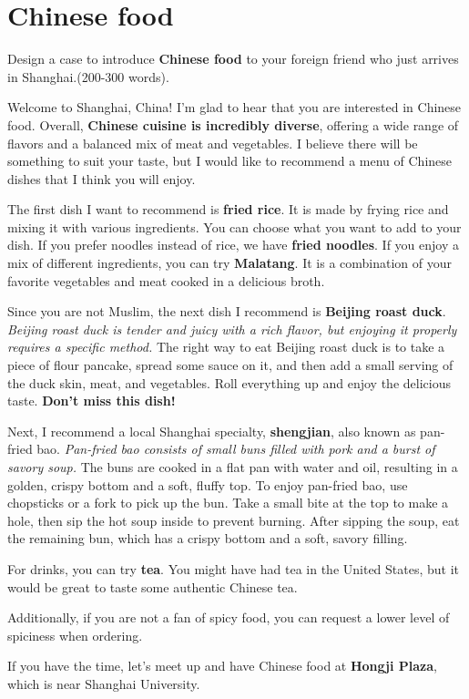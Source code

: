 \section{Chinese food}

\begin{question}{}{}
    Design a case to introduce \textbf{Chinese food} to your foreign friend who just arrives in Shanghai.(200-300 words).
\end{question}

Welcome to Shanghai, China! I'm glad to hear that you are interested in Chinese food. Overall, \textbf{Chinese cuisine is incredibly diverse}, offering a wide range of flavors and a balanced mix of meat and vegetables. I believe there will be something to suit your taste, but I would like to recommend a menu of Chinese dishes that I think you will enjoy.

The first dish I want to recommend is \textbf{fried rice}. It is made by frying rice and mixing it with various ingredients. You can choose what you want to add to your dish. If you prefer noodles instead of rice, we have \textbf{fried noodles}. If you enjoy a mix of different ingredients, you can try \textbf{Malatang}. It is a combination of your favorite vegetables and meat cooked in a delicious broth.

Since you are not Muslim, the next dish I recommend is \textbf{Beijing roast duck}. \textit{Beijing roast duck is tender and juicy with a rich flavor, but enjoying it properly requires a specific method.} The right way to eat Beijing roast duck is to take a piece of flour pancake, spread some sauce on it, and then add a small serving of the duck skin, meat, and vegetables. Roll everything up and enjoy the delicious taste. \textbf{Don't miss this dish!}

Next, I recommend a local Shanghai specialty, \textbf{shengjian}, also known as pan-fried bao. \textit{Pan-fried bao consists of small buns filled with pork and a burst of savory soup.} The buns are cooked in a flat pan with water and oil, resulting in a golden, crispy bottom and a soft, fluffy top. To enjoy pan-fried bao, use chopsticks or a fork to pick up the bun. Take a small bite at the top to make a hole, then sip the hot soup inside to prevent burning. After sipping the soup, eat the remaining bun, which has a crispy bottom and a soft, savory filling.

For drinks, you can try \textbf{tea}. You might have had tea in the United States, but it would be great to taste some authentic Chinese tea.

Additionally, if you are not a fan of spicy food, you can request a lower level of spiciness when ordering.

If you have the time, let's meet up and have Chinese food at \textbf{Hongji Plaza}, which is near Shanghai University.

